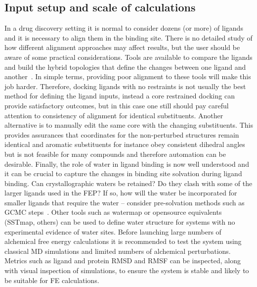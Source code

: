 \documentclass[9pt,bestpractices]{livecoms}
\begin{document}
\subsection{Input setup and scale of calculations}
In a drug discovery setting it is normal to consider dozens (or more) of ligands and it is necessary to align them in the binding site. There is no detailed study of how different alignment approaches may affect results, but the user should be aware of some practical considerations. Tools are available to compare the ligands and build the hybrid topologies that define the changes between one ligand and another~\cite{loeffler2015fesetup,hedges2019biosimspace,gapsys2015pmx}. In simple terms, providing poor alignment to these tools will make this job harder. Therefore, docking ligands with no restraints is not usually the best method for defining the ligand inputs, instead a core restrained docking can provide satisfactory outcomes, but in this case one still should pay careful attention to consistency of alignment for identical substituents. Another alternative is to manually edit the same core with the changing substituents. This provides assurances that coordinates for the non-perturbed structures remain identical and aromatic substituents for instance obey consistent dihedral angles but is not feasible for many compounds and therefore automation can be desirable. Finally, the role of water in ligand binding is now well understood and it can be crucial to capture the changes in binding site solvation during ligand binding. Can crystallographic waters be retained? Do they clash with some of the larger ligands used in the FEP? If so, how will the water be incorporated for smaller ligands that require the water – consider pre-solvation methods such as GCMC steps~\cite{michel2010prediction}. Other tools such as watermap or opensource equivalents (SSTmap, others) can be used to define water structure for systems with no experimental evidence of water sites. Before launching large numbers of alchemical free energy calculations it is recommended to test the system using classical MD simulations and limited numbers of alchemical perturbations. Metrics such as ligand and protein RMSD and RMSF can be inspected, along with visual inspection of simulations, to ensure the system is stable and likely to be suitable for FE calculations. 
\end{document}
